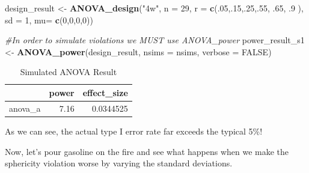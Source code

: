 \documentclass[]{book}
\newenvironment{Shaded}{\begin{snugshade}}{\end{snugshade}}
\newcommand{\CommentTok}[1]{\textcolor[rgb]{0.56,0.35,0.01}{\textit{#1}}}
\newcommand{\DataTypeTok}[1]{\textcolor[rgb]{0.13,0.29,0.53}{#1}}
\newcommand{\DecValTok}[1]{\textcolor[rgb]{0.00,0.00,0.81}{#1}}
\newcommand{\FloatTok}[1]{\textcolor[rgb]{0.00,0.00,0.81}{#1}}
\newcommand{\KeywordTok}[1]{\textcolor[rgb]{0.13,0.29,0.53}{\textbf{#1}}}
\newcommand{\NormalTok}[1]{#1}
\newcommand{\OtherTok}[1]{\textcolor[rgb]{0.56,0.35,0.01}{#1}}
\newcommand{\StringTok}[1]{\textcolor[rgb]{0.31,0.60,0.02}{#1}}
\begin{document}
\begin{Shaded}
\begin{Highlighting}[]
\NormalTok{design_result <-}\StringTok{ }\KeywordTok{ANOVA_design}\NormalTok{(}\StringTok{"4w"}\NormalTok{,}
                              \DataTypeTok{n =} \DecValTok{29}\NormalTok{,}
                              \DataTypeTok{r =} \KeywordTok{c}\NormalTok{(.}\DecValTok{05}\NormalTok{,.}\DecValTok{15}\NormalTok{,.}\DecValTok{25}\NormalTok{,.}\DecValTok{55}\NormalTok{, }\FloatTok{.65}\NormalTok{, }\FloatTok{.9}
\NormalTok{                                    ),}
                              \DataTypeTok{sd =} \DecValTok{1}\NormalTok{,}
                              \DataTypeTok{mu=} \KeywordTok{c}\NormalTok{(}\DecValTok{0}\NormalTok{,}\DecValTok{0}\NormalTok{,}\DecValTok{0}\NormalTok{,}\DecValTok{0}\NormalTok{))}

\CommentTok{#In order to simulate violations we MUST use ANOVA_power}
\NormalTok{power_result_s1 <-}\StringTok{ }\KeywordTok{ANOVA_power}\NormalTok{(design_result, }\DataTypeTok{nsims =}\NormalTok{ nsims, }\DataTypeTok{verbose =} \OtherTok{FALSE}\NormalTok{)}
\end{Highlighting}
\end{Shaded}

\begin{table}[!h]

\caption{\label{tab:unnamed-chunk-175}Simulated ANOVA Result}
\centering
\begin{tabular}{l|r|r}
\hline
  & power & effect\_size\\
\hline
anova\_a & 7.16 & 0.0344525\\
\hline
\end{tabular}
\end{table}

As we can see, the actual type I error rate far exceeds the typical 5\%!

Now, let's pour gasoline on the fire and see what happens when we make the sphericity violation worse by varying the standard deviations.
\end{document}
